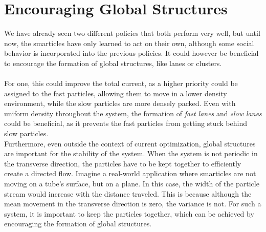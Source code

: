 \section{Encouraging Global Structures}
\label{sec:global_structures}
We have already seen two different policies that both perform very well, but until now, the smarticles have only learned to act on their own, although some social behavior is incorporated into the previous policies. It could however be beneficial to encourage the formation of global structures, like lanes or clusters. 
\\
\\
For one, this could improve the total current, as a higher priority could be assigned to the fast particles, allowing them to move in a lower density environment, while the slow particles are more densely packed. Even with uniform density throughout the system, the formation of \textit{fast lanes} and \textit{slow lanes} could be beneficial, as it prevents the fast particles from getting stuck behind slow particles.
\\
Furthermore, even outside the context of current optimization, global structures are important for the stability of the system. When the system is not periodic in the transverse direction, the particles have to be kept together to efficiently create a directed flow. Imagine a real-world application where smarticles are not moving on a tube's surface, but on a plane. In this case, the width of the particle stream would increase with the distance traveled. This is because although the mean movement in the transverse direction is zero, the variance is not. For such a system, it is important to keep the particles together, which can be achieved by encouraging the formation of global structures.

